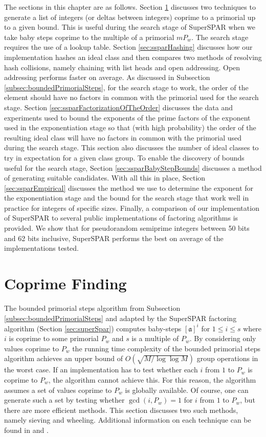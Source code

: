 \documentclass{ucalgthes1}
\theoremstyle{definition}
\newcommand{\ideal}{\mathfrak}
\newcommand{\idealclass}[1]{\left[ \ideal #1 \right]}
\newcommand{\aclass}{\idealclass a}
\begin{document}
The sections in this chapter are as follows.  Section \ref{sec:ssparCoprimeFinding} discusses two techniques to generate a list of integers (or deltas between integers) coprime to a primorial up to a given bound.  This is useful during the search stage of SuperSPAR when we take baby steps coprime to the multiple of a primorial $mP_w$.  The search stage requires the use of a lookup table.  Section \ref{sec:ssparHashing} discusses how our implementation hashes an ideal class and then compares two methods of resolving hash collisions, namely chaining with list heads and open addressing.  Open addressing performs faster on average.  As discussed in Subsection \ref{subsec:boundedPrimorialSteps}, for the search stage to work, the order of the element should have no factors in common with the primorial used for the search stage.  Section \ref{sec:ssparFactorizationOfTheOrder} discusses the data and experiments used to bound the exponents of the prime factors of the exponent used in the exponentiation stage so that (with high probability) the order of the resulting ideal class will have no factors in common with the primorial used during the search stage.  This section also discusses the number of ideal classes to try in expectation for a given class group.  To enable the discovery of bounds useful for the search stage, Section \ref{sec:ssparBabyStepBounds} discusses a method of generating suitable candidates.  With all this in place, Section \ref{sec:ssparEmpirical} discusses the method we use to determine the exponent for the exponentiation stage and the bound for the search stage that work well in practice for integers of specific sizes.  Finally, a comparison of our implementation of SuperSPAR to several public implementations of factoring algorithms is provided.  We show that for pseudorandom semiprime integers between 50 bits and 62 bits inclusive, SuperSPAR performs the best on average of the implementations tested.


\section{Coprime Finding}
\label{sec:ssparCoprimeFinding}

The bounded primorial steps algorithm from Subsection \ref{subsec:boundedPrimorialSteps} and adapted by the SuperSPAR factoring algorithm (Section \ref{sec:superSpar}) computes baby-steps $\aclass^i$ for $1 \le i \le s$ where $i$ is coprime to some primorial $P_w$ and $s$ is a multiple of $P_w$.  By considering only values coprime to $P_w$ the running time complexity of the bounded primorial steps algorithm achieves an upper bound of $O(\sqrt{M/\log \log M})$ group operations in the worst case.  If an implementation has to test whether each $i$ from $1$ to $P_w$ is coprime to $P_w$, the algorithm cannot achieve this.  For this reason, the algorithm assumes a set of values coprime to $P_w$ is globally available.  Of course, one can generate such a set by testing whether $\gcd(i, P_w) = 1$ for $i$ from $1$ to $P_w$, but there are more efficient methods.  This section discusses two such methods, namely sieving and wheeling.  Additional information on each technique can be found in \cite[pp.117--127]{Crandall2001} and \cite[p.494]{Sutherland2009}.
\end{document}
